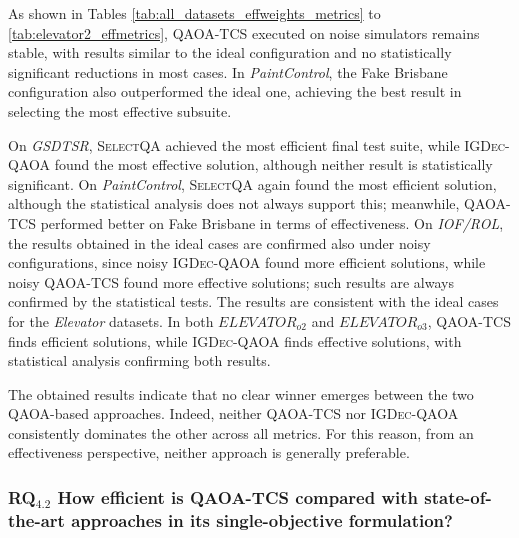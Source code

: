 As shown in Tables \ref{tab:all_datasets_effweights_metrics} to \ref{tab:elevator2_effmetrics}, \textsc{QAOA-TCS} executed on noise simulators remains stable, with results similar to the ideal configuration and no statistically significant reductions in most cases. In \textit{PaintControl}, the Fake Brisbane configuration also outperformed the ideal one, achieving the best result in selecting the most effective subsuite.

On \textit{GSDTSR}, \textsc{SelectQA} achieved the most efficient final test suite, while \textsc{IGDec-QAOA} found the most effective solution, although neither result is statistically significant. On \textit{PaintControl}, \textsc{SelectQA} again found the most efficient solution, although the statistical analysis does not always support this; meanwhile, \textsc{QAOA-TCS} performed better on Fake Brisbane in terms of effectiveness. On \textit{IOF/ROL}, the results obtained in the ideal cases are confirmed also under noisy configurations, since noisy \textsc{IGDec-QAOA} found more efficient solutions, while noisy \textsc{QAOA-TCS} found more effective solutions; such results are always confirmed by the statistical tests.
The results are consistent with the ideal cases for the \textit{Elevator} datasets. In both $ELEVATOR_{o2}$ and $ELEVATOR_{o3}$, \textsc{QAOA-TCS} finds efficient solutions, while \textsc{IGDec-QAOA} finds effective solutions, with statistical analysis confirming both results.

The obtained results indicate that no clear winner emerges between the two QAOA-based approaches. Indeed, neither \textsc{QAOA-TCS} nor \textsc{IGDec-QAOA} consistently dominates the other across all metrics. For this reason, from an effectiveness perspective, neither approach is generally preferable.


\subsubsection{RQ$_{4.2}$ How efficient is \textsc{QAOA-TCS} compared 
with state-of-the-art approaches in its single-objective formulation?}

